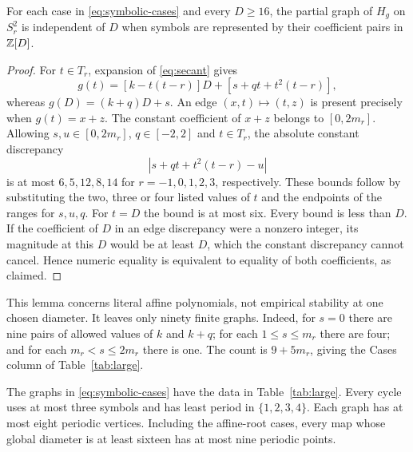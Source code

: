 \begin{lemma}
\label{lem:no-carry}
For each case in \eqref{eq:symbolic-cases} and every $D\ge16$,
the partial graph of $H_g$ on $S_r^2$ is independent of $D$ when
symbols are represented by their coefficient pairs in $\mathbb{Z}[D]$.
\end{lemma}
\begin{proof}
For $t\in T_r$, expansion of \eqref{eq:secant} gives
\begin{equation}
 g(t)=[k-t(t-r)]D+[s+qt+t^2(t-r)],
 \label{eq:symbolic-value}
\end{equation}
whereas $g(D)=(k+q)D+s$. An edge $(x,t)\mapsto(t,z)$ is
present precisely when $g(t)=x+z$. The constant coefficient of
$x+z$ belongs to $[0,2m_r]$. Allowing
$s,u\in[0,2m_r]$, $q\in[-2,2]$ and $t\in T_r$, the absolute
constant discrepancy
\[
 |s+qt+t^2(t-r)-u|
\]
is at most $6,5,12,8,14$ for $r=-1,0,1,2,3$, respectively.
These bounds follow by substituting the two, three or four listed
values of $t$ and the endpoints of the ranges for $s,u,q$.
For $t=D$ the bound is at most six. Every bound is less than $D$.
If the coefficient of $D$ in an edge discrepancy were a nonzero
integer, its magnitude at this $D$ would be at least $D$, which
the constant discrepancy cannot cancel. Hence numeric equality is
equivalent to equality of both coefficients, as claimed.
\end{proof}

This lemma concerns literal affine polynomials, not empirical stability
at one chosen diameter. It leaves only ninety finite graphs. Indeed,
for $s=0$ there are nine pairs of allowed values of $k$ and $k+q$;
for each $1\le s\le m_r$ there are four; and for each
$m_r<s\le2m_r$ there is one. The count is $9+5m_r$, giving the
Cases column of Table~\ref{tab:large}.

\begin{proposition}
\label{prop:large-computation}
The graphs in \eqref{eq:symbolic-cases} have the data in
Table~\ref{tab:large}. Every cycle uses at most three symbols and
has least period in $\{1,2,3,4\}$. Each graph has at most eight
periodic vertices. Including the affine-root cases, every map whose
global diameter is at least sixteen has at most nine periodic points.
\end{proposition}

